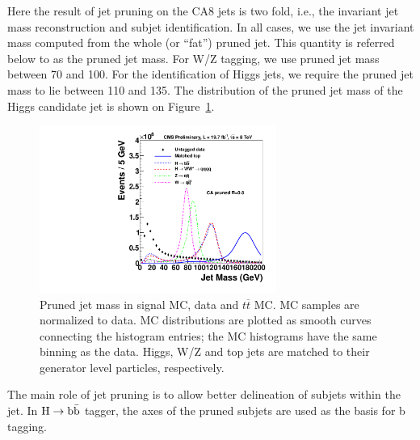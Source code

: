 Here the result of jet pruning on the CA8 jets is two fold, i.e., the invariant jet mass 
reconstruction and subjet identification.
In all cases,
we use the jet invariant mass computed from the whole (or ``fat'') 
pruned jet.  This quantity is referred below to as the pruned jet mass.
For W/Z tagging, we use pruned jet mass between 70 and 100\GeVcc. 
For the identification of Higgs jets, we require the pruned jet mass to
lie between 110 and 135\GeVcc.  The distribution of the pruned jet
mass of the Higgs candidate jet is shown on Figure~\ref{fig:JetMassTagging}. 


\begin{figure}[htb]
\begin{center}
\includegraphics[width=0.69\textwidth]{EXO-14-009/HbbZqqfigs/Signal/signal-data-qcd-jetmass.pdf}
\end{center}
\caption{Pruned jet mass in signal MC, data and $t\overline{t}$ MC. 
  MC samples are normalized to data.  MC
  distributions are plotted as smooth curves connecting the histogram
  entries; the MC histograms have the same binning as the data.
  Higgs, W/Z and top jets are matched to their generator level particles, 
  respectively. }
\label{fig:JetMassTagging}
\end{figure}


The main role of jet pruning is to allow better delineation of subjets
within the jet.  In ${\rm H \to b\bar{b}}$ tagger, the axes of the 
pruned subjets are used as the basis for b tagging.



